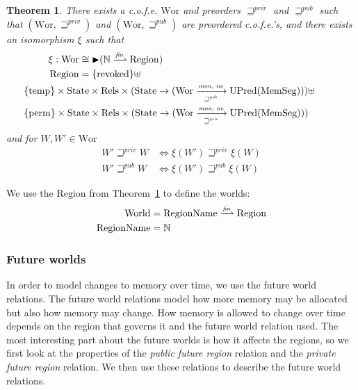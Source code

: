 \documentclass[compsoc,conference,letterpaper,fleqn]{IEEEtran}
\newtheorem{theorem}{Theorem}
\newcommand{\finparfun}{\xrightharpoonup{\textit{\tiny{fin}}}}
\newcommand{\fun}{\rightarrow}
\newcommand{\blater}{\mathop{\blacktriangleright}}
\newcommand{\cofe}{c.o.f.e.}
\newcommand{\cofes}{\cofe{}'s}
\newcommand{\var}[1]{\mathit{#1}}
\newcommand{\futurewk}{\mathbin{\sqsupseteq}^{\var{pub}}}
\newcommand{\futurestr}{\mathbin{\sqsupseteq}^{\var{priv}}}
\newcommand{\monwknefun}{\xrightarrow[\text{\tiny{$\futurewk$}}]{\textit{\tiny{mon, ne}}}}
\newcommand{\monstrnefun}{\xrightarrow[\text{\tiny{$\futurestr$}}]{\textit{\tiny{mon, ne}}}}
\newcommand{\plaindom}[1]{\mathrm{#1}}
\newcommand{\HeapSegments}{\plaindom{MemSeg}}
\newcommand{\nats}{\mathbb{N}}
\newcommand{\Rels}{\plaindom{Rels}}
\newcommand{\States}{\plaindom{State}}
\newcommand{\RegionNames}{\plaindom{RegionName}}
\newcommand{\Regions}{\plaindom{Region}}
\newcommand{\Worlds}{\plaindom{World}}
\newcommand{\Wor}{\plaindom{Wor}}
\newcommand{\UPred}[1]{\plaindom{UPred}(#1)}
\newcommand{\plainview}[1]{\mathrm{#1}}
\newcommand{\perma}{\plainview{perm}}
\newcommand{\temp}{\plainview{temp}}
\newcommand{\revoked}{\plainview{revoked}}
\begin{document}
\begin{theorem}\label{thm:world-existence}
  There exists a \cofe{} $\Wor$ and preorders $\futurestr$ and
  $\futurewk$ such that $(\Wor,\futurestr)$ and $(\Wor,\futurewk)$ are
  preordered \cofes{}, and there exists an isomorphism $\xi$ such that
  {\small
    \begin{align*}              
      \xi : \Wor & \cong \blater (\nats \finparfun \Regions)\\
      \Regions & = \{\revoked\} \uplus \\
                 &\hskip -2cm \{\temp\} \times \States \times \Rels \times (\States \fun (\Wor \monwknefun \UPred{\HeapSegments})) \uplus \\
                 & \hskip -2cm \{\perma\} \times \States \times \Rels \times (\States \fun (\Wor \monstrnefun \UPred{\HeapSegments}))
    \end{align*}
  } and for $W, W' \in \Wor$
  \begin{align*}
    W' \futurestr W & \Leftrightarrow \xi(W') \futurestr \xi(W)   \\
    W' \futurewk W & \Leftrightarrow \xi(W') \futurewk \xi(W)
  \end{align*}
\end{theorem}
We use the $\Regions$ from Theorem~\ref{thm:world-existence} to define
the worlds:
\begin{align*}
  \Worlds & = \RegionNames \finparfun \Regions\\
 \RegionNames & = \nats
\end{align*}

\subsubsection{Future worlds}
In order to model changes to memory over time, we use the future world
relations. The future world relations model how more memory may be
allocated but also how memory may change. How memory is allowed to
change over time depends on the region that governs it and the future
world relation used. The most interesting part about the future worlds
is how it affects the regions, so we first look at the properties of
the \emph{public future region} relation and the \emph{private future
  region} relation. We then use these relations to describe the future
world relations.
\end{document}
